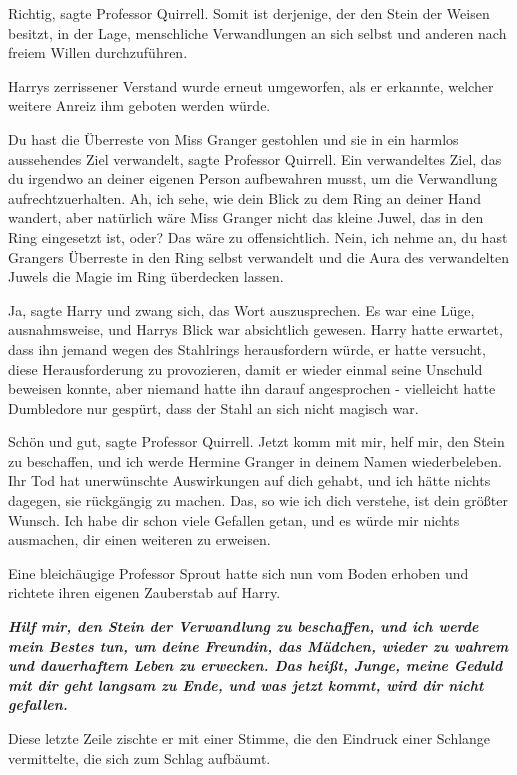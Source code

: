 \glqq{}Richtig\grqq{}, sagte Professor Quirrell. \glqq{}Somit ist derjenige, der
den Stein der Weisen besitzt, in der Lage, menschliche Verwandlungen an sich
selbst und anderen nach freiem Willen durchzuführen.\grqq{}

Harrys zerrissener Verstand wurde erneut umgeworfen, als er erkannte, welcher
weitere Anreiz ihm geboten werden würde.

\glqq{}Du hast die Überreste von Miss Granger gestohlen und sie in ein harmlos
aussehendes Ziel verwandelt\grqq{}, sagte Professor Quirrell. \glqq{}Ein
verwandeltes Ziel, das du irgendwo an deiner eigenen Person aufbewahren musst,
um die Verwandlung aufrechtzuerhalten. Ah, ich sehe, wie dein Blick zu dem Ring
an deiner Hand wandert, aber natürlich wäre Miss Granger nicht das kleine Juwel,
das in den Ring eingesetzt ist, oder? Das wäre zu offensichtlich. Nein, ich
nehme an, du hast Grangers Überreste in den Ring selbst verwandelt und die Aura
des verwandelten Juwels die Magie im Ring überdecken lassen.\grqq{}

\glqq{}Ja\grqq{}, sagte Harry und zwang sich, das Wort auszusprechen. Es war eine
Lüge, ausnahmsweise, und Harrys Blick war absichtlich gewesen. Harry hatte
erwartet, dass ihn jemand wegen des Stahlrings herausfordern würde, er hatte
versucht, diese Herausforderung zu provozieren, damit er wieder einmal seine
Unschuld beweisen konnte, aber niemand hatte ihn darauf angesprochen -
vielleicht hatte Dumbledore nur gespürt, dass der Stahl an sich nicht magisch
war.

\glqq{}Schön und gut\grqq{}, sagte Professor Quirrell. \glqq{}Jetzt komm mit mir,
helf mir, den Stein zu beschaffen, und ich werde Hermine Granger in deinem Namen
wiederbeleben. Ihr Tod hat unerwünschte Auswirkungen auf dich gehabt, und ich
hätte nichts dagegen, sie rückgängig zu machen. Das, so wie ich dich verstehe,
ist dein größter Wunsch. Ich habe dir schon viele Gefallen getan, und es würde
mir nichts ausmachen, dir einen weiteren zu erweisen.\grqq{}

Eine bleichäugige Professor Sprout hatte sich nun vom Boden erhoben und richtete
ihren eigenen Zauberstab auf Harry.

\glqq{}\textbf{\emph{Hilf mir, den Stein der Verwandlung zu beschaffen, und ich
werde mein Bestes tun, um deine Freundin, das Mädchen, wieder zu wahrem und
dauerhaftem Leben zu erwecken. Das heißt, Junge, meine Geduld mit dir geht
langsam zu Ende, und was jetzt kommt, wird dir nicht gefallen.}}\grqq{}

Diese letzte Zeile zischte er mit einer Stimme, die den Eindruck einer Schlange
vermittelte, die sich zum Schlag aufbäumt.

